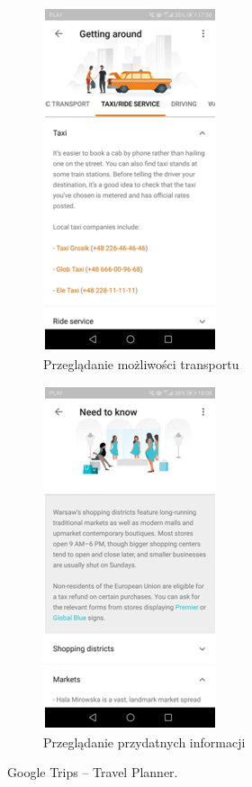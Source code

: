 \documentclass[10pt,twoside,a4paper]{report}
\begin{document}
\begin{figure}[h]
\begin{subfigure}{0.5\textwidth}
\centering
\includegraphics[width=0.9\linewidth, width=5cm]{googletrips5}
\caption{Przeglądanie możliwości transportu}
\label{fig:GTsubim5}
\end{subfigure}
\begin{subfigure}{0.5\textwidth}
\centering
\includegraphics[width=0.9\linewidth, width=5cm]{googletrips6}
\caption{Przeglądanie przydatnych informacji}
\label{fig:GTsubim6}
\end{subfigure}
\caption{Google Trips -- Travel Planner.}
\label{fig:GTimage3}
\end{figure}
\end{document}
